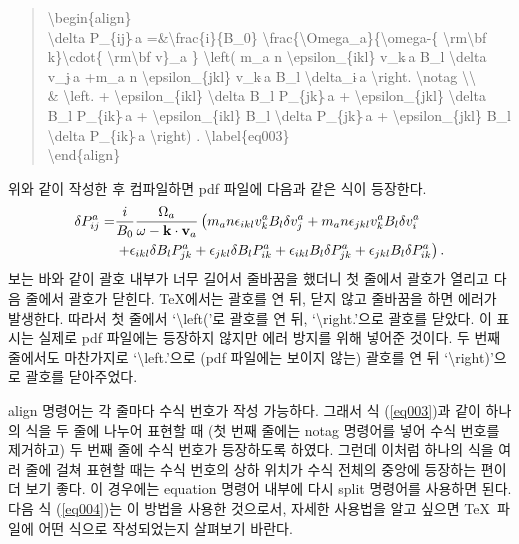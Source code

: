 \documentclass{gshs-report-v1.2}
\begin{document}
\begin{quote}
	{\textbackslash}begin\{align\}\\
	{\textbackslash}delta P\_\{ij\}$\hat{\ }$a =\&{\textbackslash}frac\{i\}\{B\_0\} {\textbackslash}frac\{{\textbackslash}Omega\_a\}\{{\textbackslash}omega-\{ {\textbackslash}rm{\textbackslash}bf k\}{\textbackslash}cdot\{ {\textbackslash}rm{\textbackslash}bf v\}\_a \} {\textbackslash}left( m\_a n {\textbackslash}epsilon\_\{ikl\} v\_k$\hat{\ }$a B\_l {\textbackslash}delta v\_j$\hat{\ }$a +m\_a n {\textbackslash}epsilon\_\{jkl\} v\_k$\hat{\ }$a B\_l {\textbackslash}delta\_i$\hat{\ }$a {\textbackslash}right. {\textbackslash}notag {\textbackslash}{\textbackslash} \\
	\& {\textbackslash}left. + {\textbackslash}epsilon\_\{ikl\} {\textbackslash}delta B\_l P\_\{jk\}$\hat{\ }$a + {\textbackslash}epsilon\_\{jkl\} {\textbackslash}delta B\_l P\_\{ik\}$\hat{\ }$a + {\textbackslash}epsilon\_\{ikl\} B\_l {\textbackslash}delta P\_\{jk\}$\hat{\ }$a + {\textbackslash}epsilon\_\{jkl\} B\_l {\textbackslash}delta P\_\{ik\}$\hat{\ }$a {\textbackslash}right) . {\textbackslash}label\{eq003\} \\
	{\textbackslash}end\{align\}
\end{quote}
위와 같이 작성한 후 컴파일하면 pdf 파일에 다음과 같은 식이 등장한다.
\begin{align}
\delta P_{ij}^a =&\frac{i}{B_0} \frac{\Omega_a}{\omega-{\rm\bf k}\cdot{\rm\bf v}_a} \left( m_a n \epsilon_{ikl} v_k^a B_l \delta v_j^a +m_a n \epsilon_{jkl} v_k^a B_l \delta v_i^a \right. \notag\\
&\left. +\epsilon_{ikl} \delta B_l P_{jk}^a +\epsilon_{jkl} \delta B_l P_{ik}^a +\epsilon_{ikl} B_l \delta P_{jk}^a +\epsilon_{jkl} B_l \delta P_{ik}^a \right) . \label{eq003}
\end{align}
보는 바와 같이 괄호 내부가 너무 길어서 줄바꿈을 했더니 첫 줄에서 괄호가 열리고 다음 줄에서 괄호가 닫힌다. \TeX 에서는 괄호를 연 뒤, 닫지 않고 줄바꿈을 하면 에러가 발생한다. 따라서 첫 줄에서 `{\textbackslash}left('로 괄호를 연 뒤, `{\textbackslash}right.'으로 괄호를 닫았다. 이 표시는 실제로 pdf 파일에는 등장하지 않지만 에러 방지를 위해 넣어준 것이다. 두 번째 줄에서도 마찬가지로 `{\textbackslash}left.'으로 (pdf 파일에는 보이지 않는) 괄호를 연 뒤 `{\textbackslash}right)'으로 괄호를 닫아주었다.

align 명령어는 각 줄마다 수식 번호가 작성 가능하다. 그래서 식 (\ref{eq003})과 같이 하나의 식을 두 줄에 나누어 표현할 때 (첫 번째 줄에는 notag 명령어를 넣어 수식 번호를 제거하고) 두 번째 줄에 수식 번호가 등장하도록 하였다. 그런데 이처럼 하나의 식을 여러 줄에 걸쳐 표현할 때는 수식 번호의 상하 위치가 수식 전체의 중앙에 등장하는 편이 더 보기 좋다. 이 경우에는 equation 명령어 내부에 다시 split 명령어를 사용하면 된다. 다음 식 (\ref{eq004})는 이 방법을 사용한 것으로서, 자세한 사용법을 알고 싶으면 \TeX\ 파일에 어떤 식으로 작성되었는지 살펴보기 바란다.
\end{document}

